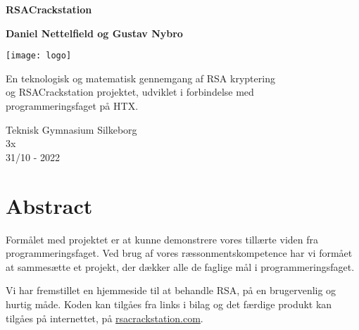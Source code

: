 \documentclass[a4paper,12pt]{extarticle}
\begin{document}
    \begin{titlepage}
        \begin{center}
            \vspace{1cm}

            \begin{huge}
                \textbf{RSACrackstation}
            \end{huge}

            \vspace{1cm}

            \textbf{Daniel Nettelfield og Gustav Nybro}

            \vspace{1.5cm}

            \noindent
            \texttt{[image: logo]}

            \vfill

            En teknologisk og matematisk gennemgang af RSA kryptering\\
            og RSACrackstation projektet, udviklet i forbindelse med\\
            programmeringsfaget på HTX.\@

            \vspace{0.8cm}

            Teknisk Gymnasium Silkeborg\\
            3x\\
            31/10 - 2022

        \end{center}
    \end{titlepage}

    \newpage

    \section*{Abstract}\label{sec:abstract}

    Formålet med projektet er at kunne demonstrere vores tillærte viden fra programmeringsfaget.
    Ved brug af vores ræssonmentskompetence har vi formået at sammesætte et projekt,
    der dækker alle de faglige mål i programmeringsfaget.

    Vi har fremstillet en hjemmeside til at behandle RSA, på en brugervenlig og hurtig måde.
    Koden kan tilgåes fra links i bilag og det færdige produkt kan tilgåes på internettet,
    på \href{https://rsacrackstation.com}{rsacrackstation.com}.

    \newpage
\end{document}
